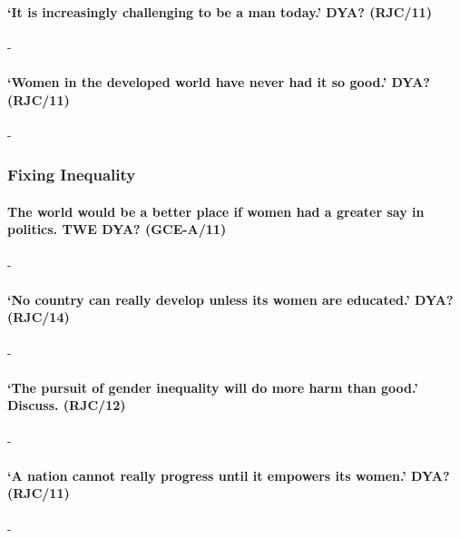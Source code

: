 \documentclass[../../main]{subfiles}
\begin{document}
\paragraph{`It is increasingly challenging to be a man today.' DYA? (RJC/11)}-

\paragraph{`Women in the developed world have never had it so good.' DYA? (RJC/11)}-

\subsubsection{Fixing Inequality}

\paragraph{The world would be a better place if women had a greater say in politics. TWE DYA? (GCE-A/11)}-

\paragraph{`No country can really develop unless its women are educated.' DYA? (RJC/14)}-

\paragraph{`The pursuit of gender inequality will do more harm than good.' Discuss. (RJC/12)}-

\paragraph{`A nation cannot really progress until it empowers its women.' DYA? (RJC/11)}-
\end{document}
